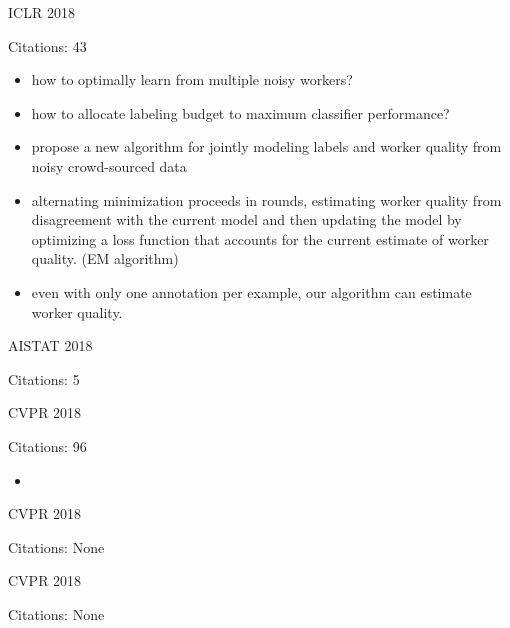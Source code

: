 \documentclass[11pt]{article}
\begin{document}
\vspace{2cm}

\noindent ICLR 2018

\noindent Citations: 43

\begin{itemize}
\item how to optimally learn from multiple noisy workers?
\item how to allocate labeling budget to maximum classifier performance?
\item propose a new algorithm for jointly modeling labels and worker quality from noisy crowd-sourced data
\item alternating minimization proceeds in rounds, estimating worker quality from disagreement with the current model and then updating the model by optimizing a loss function that accounts for the current estimate of worker quality. (EM algorithm)
\item even with only one annotation per example, our algorithm can estimate worker quality.
\end{itemize}

\vspace{2cm}

\noindent AISTAT 2018

\noindent Citations: 5

\vspace{2cm}

\noindent CVPR 2018

\noindent Citations: 96

\begin{itemize}
\item 
\end{itemize}

\vspace{2cm}

\noindent CVPR 2018

\noindent Citations: None

\vspace{2cm}

\noindent CVPR 2018

\noindent Citations: None

\vspace{2cm}
\end{document}
